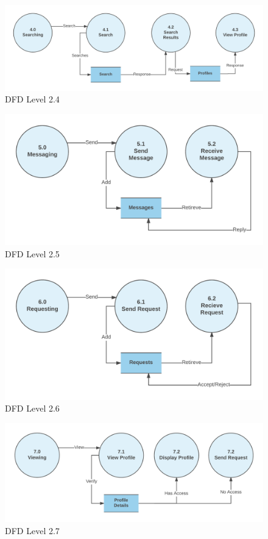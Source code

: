 \documentclass[12pt]{report}
\begin{document}
\begin{figure}[!htb]
    \centering
    \includegraphics[width=.8\textwidth]{df-l2-4.png}
    \caption{DFD Level 2.4}
    \label{fig:dfd l2.4}
\end{figure}

\begin{figure}[!htb]
    \centering
    \includegraphics[width=.8\textwidth]{df-l2-5.png}
    \caption{DFD Level 2.5}
    \label{fig:dfd l2.5}
\end{figure}

\begin{figure}[!htb]
    \centering
    \includegraphics[width=.8\textwidth]{df-l2-6.png}
    \caption{DFD Level 2.6}
    \label{fig:dfd l2.6}
\end{figure}

\begin{figure}[!htb]
    \centering
    \includegraphics[width=.8\textwidth]{df-l2-7.png}
    \caption{DFD Level 2.7}
    \label{fig:dfd l2.7}
\end{figure}
\end{document}
